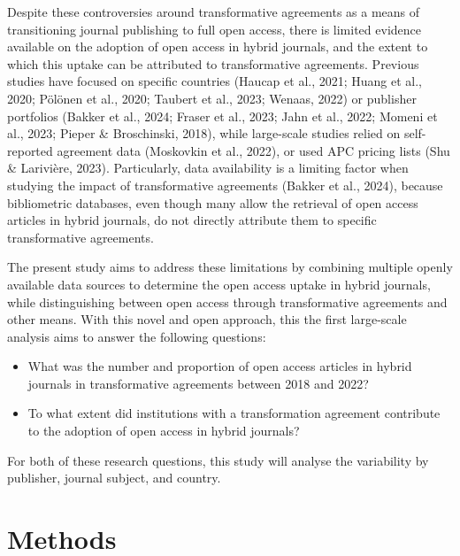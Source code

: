 \documentclass[a4paper,man,floatsintext,longtable,noextraspace,12pt]{apa6}
\providecommand{\tightlist}{%
  \setlength{\itemsep}{0pt}\setlength{\parskip}{0pt}}
\begin{document}
Despite these controversies around transformative agreements as a means
of transitioning journal publishing to full open access, there is
limited evidence available on the adoption of open access in hybrid
journals, and the extent to which this uptake can be attributed to
transformative agreements. Previous studies have focused on specific
countries (Haucap et al., 2021; Huang et al., 2020; Pölönen et al.,
2020; Taubert et al., 2023; Wenaas, 2022) or publisher portfolios
(Bakker et al., 2024; Fraser et al., 2023; Jahn et al., 2022; Momeni et
al., 2023; Pieper \& Broschinski, 2018), while large-scale studies
relied on self-reported agreement data (Moskovkin et al., 2022), or used
APC pricing lists (Shu \& Larivière, 2023). Particularly, data
availability is a limiting factor when studying the impact of
transformative agreements (Bakker et al., 2024), because bibliometric
databases, even though many allow the retrieval of open access articles
in hybrid journals, do not directly attribute them to specific
transformative agreements.

The present study aims to address these limitations by combining
multiple openly available data sources to determine the open access
uptake in hybrid journals, while distinguishing between open access
through transformative agreements and other means. With this novel and
open approach, this the first large-scale analysis aims to answer the
following questions:

\begin{itemize}
\tightlist
\item
  What was the number and proportion of open access articles in hybrid
  journals in transformative agreements between 2018 and 2022?
\item
  To what extent did institutions with a transformation agreement
  contribute to the adoption of open access in hybrid journals?
\end{itemize}

For both of these research questions, this study will analyse the
variability by publisher, journal subject, and country.

\hypertarget{methods}{%
\section{Methods}\label{methods}}
\end{document}
